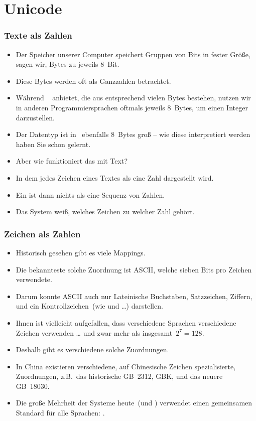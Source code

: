 \documentclass[aspectratio=169,mathserif,notheorems]{beamer}%
\begin{document}
\section{Unicode}%
%
\begin{frame}%
\frametitle{Texte als Zahlen}%
\begin{itemize}%
\item Der Speicher unserer Computer speichert Gruppen von Bits in fester Größe, sagen wir, Bytes zu jeweils 8~Bit.%
\item<2-> Diese Bytes werden oft als Ganzzahlen betrachtet.%
\item<3-> Während \python\   anbietet, die aus entsprechend vielen Bytes bestehen, nutzen wir in anderen Programmiersprachen oftmals jeweils 8~Bytes, um einen Integer darzustellen.
\item<4-> Der Datentyp  ist in \python\ ebenfalls 8~Bytes groß -- wie diese interpretiert werden haben Sie schon gelernt.%
\item<5-> Aber wie funktioniert das mit Text?%
\item<6-> In dem jedes Zeichen eines Textes als eine Zahl dargestellt wird.%
\item<7-> Ein  ist dann nichts als eine Sequenz von Zahlen.%
\item<8-> Das System weiß, welches Zeichen zu welcher Zahl gehört.
\end{itemize}%
\end{frame}%
%
\begin{frame}%
\frametitle{Zeichen als Zahlen}%
\begin{itemize}%
\item Historisch gesehen gibt es viele  Mappings.%
\item<2-> Die bekannteste solche Zuordnung ist ASCII\cite{ASA1963ASCII,USAS1967USCFII}, welche sieben Bits pro Zeichen verwendete.%
\item<3-> Darum konnte ASCII auch nur Lateinische Buchstaben, Satzzeichen, Ziffern, und ein Kontrollzeichen~(wie \textil{\\t} und \textil{\\n}\dots) darstellen.%
\item<4-> Ihnen ist vielleicht aufgefallen, dass verschiedene Sprachen verschiedene Zeichen verwenden {\dots} und zwar mehr als insgesamt~$2^7=128$.%
\item<5-> Deshalb gibt es verschiedene solche Zuordnungen.%
\item<6-> In China existieren verschiedene, auf Chinesische Zeichen spezialisierte, Zuordnungen, z.B.\ das historische GB~2312\cite{GBT23121980PROCNSG21CCECSFIE}, GBK\cite{GBK1995CICSNSE}, und das neuere GB~18030\cite{GB180302022ITCCCS}.%
\item<7-> Die große Mehrheit der Systeme heute~(und \python) verwendet einen gemeinsamen Standard für \alert{alle} Sprachen: \cite{TUC2023U1510,TUC2023U151ACS,ISOIEC106462020ITUCCSU}.%
\end{itemize}%
\end{frame}%
\end{document}
